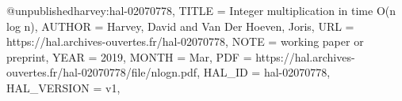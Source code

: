 @unpublished{harvey:hal-02070778,
  TITLE = {{Integer multiplication in time O(n log n)}},
  AUTHOR = {Harvey, David and Van Der Hoeven, Joris},
  URL = {https://hal.archives-ouvertes.fr/hal-02070778},
  NOTE = {working paper or preprint},
  YEAR = {2019},
  MONTH = Mar,
  PDF = {https://hal.archives-ouvertes.fr/hal-02070778/file/nlogn.pdf},
  HAL_ID = {hal-02070778},
  HAL_VERSION = {v1},
}